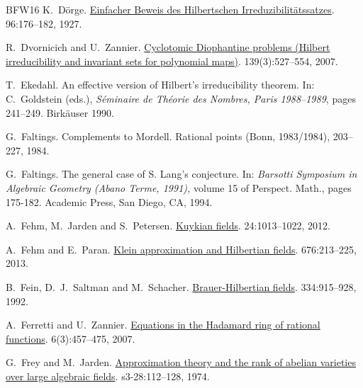 \documentclass[10pt,a4paper]{amsart}
\theoremstyle{plain}
\theoremstyle{remark}
\numberwithin{theorem}{section}
\begin{document}
\begin{thebibliography}{BFW16}
K.~Dörge.
\newblock \href{https://eudml.org/doc/159163}{Einfacher Beweis des Hilbertschen Irreduzibilitätssatzes}.
 96:176--182, 1927.

R.~Dvornicich and U.~Zannier.
\newblock \href{https://doi.org/10.1215/S0012-7094-07-13934-6}{Cyclotomic Diophantine problems (Hilbert irreducibility and invariant sets for polynomial maps)}.
 139(3):527--554, 2007.

T.~Ekedahl.
\newblock An effective version of Hilbert's irreducibility theorem.
\newblock In: C.~Goldstein (eds.), {\em S\'eminaire de Th\'eorie des Nombres, Paris 1988--1989}, pages 241--249. Birkäuser 1990.

G.~Faltings.
\newblock Complements to Mordell.
 Rational points ({B}onn, 1983/1984), 203--227, 1984. 

G.~Faltings. 
\newblock The general case of S. Lang's conjecture.
\newblock In: {\em Barsotti Symposium in Algebraic Geometry (Abano
Terme, 1991),} volume 15 of Perspect. Math., pages 175-182. Academic Press, San Diego, CA, 1994.

A.~Fehm, M.~Jarden and S.~Petersen.
\newblock \href{https://doi.org/10.1515/form.2011.094}{Kuykian fields}.
 24:1013--1022, 2012.

A.~Fehm and E.~Paran.
\newblock \href{https://doi.org/10.1515/crelle.2012.007}{Klein approximation and Hilbertian fields}.
 676:213--225, 2013.

B.~Fein, D.~J.~Saltman and M.~Schacher.
\newblock \href{https://doi.org/10.1090/S0002-9947-1992-1075382-0 }{Brauer-Hilbertian fields}.
 334:915--928, 1992. 

A.~Ferretti and U.~Zannier.
\newblock \href{https://www.numdam.org/item/ASNSP_2007_5_6_3_457_0/}{Equations in the Hadamard ring of rational functions}. 
 6(3):457--475, 2007.

G.~Frey and M.~Jarden.
\newblock \href{https://doi.org/10.1112/plms/s3-28.1.112}{Approximation theory and the rank of abelian varieties over large algebraic fields}.
 s3-28:112--128, 1974.


\end{thebibliography}
\end{document}
